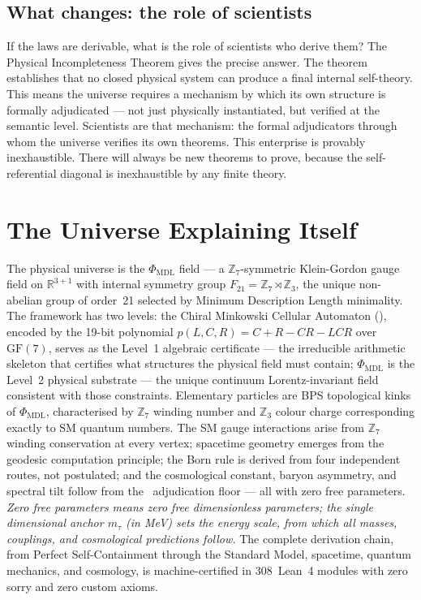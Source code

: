 \documentclass[11pt,openany]{book}
\theoremstyle{remark}
\newcommand{\PSC}{\text{PSC}}
\newcommand{\PHIMDL}{\Phi_{\mathrm{MDL}}}
\newcommand{\CMCA}{\text{CMCA}}
\newcommand{\poly}{p(L,C,R)}
\begin{document}
\subsection*{What changes: the role of scientists}

If the laws are derivable, what is the role of scientists who derive them? The
Physical Incompleteness Theorem gives the precise answer. The theorem establishes
that no closed physical system can produce a final internal self-theory. This means
the universe requires a mechanism by which its own structure is formally adjudicated
--- not just physically instantiated, but verified at the semantic level. Scientists
are that mechanism: the formal adjudicators through whom the universe verifies its
own theorems. This enterprise is provably inexhaustible. There will always be new
theorems to prove, because the self-referential diagonal is inexhaustible by
any finite theory.

\section{The Universe Explaining Itself}
\label{sec:universe_theorem}

\begin{tcolorbox}[colback=green!5,colframe=green!50!black,
  title={The Central Claim of This Monograph}]
The physical universe is the $\PHIMDL$ field --- a $\mathbb{Z}_7$-symmetric
Klein-Gordon gauge field on $\mathbb{R}^{3+1}$ with internal symmetry group
$F_{21} = \mathbb{Z}_7 \rtimes \mathbb{Z}_3$, the unique non-abelian group of
order~21 selected by Minimum Description Length minimality.
The framework has two levels: the Chiral Minkowski Cellular Automaton (\CMCA),
encoded by the 19-bit polynomial $\poly = C{+}R{-}CR{-}LCR$ over $\mathrm{GF}(7)$,
serves as the Level~1 algebraic certificate --- the irreducible arithmetic
skeleton that certifies what structures the physical field must contain;
$\PHIMDL$ is the Level~2 physical substrate --- the unique continuum
Lorentz-invariant field consistent with those constraints.
Elementary particles are BPS topological kinks of $\PHIMDL$, characterised
by $\mathbb{Z}_7$ winding number and $\mathbb{Z}_3$ colour charge
corresponding exactly to SM quantum numbers.
The SM gauge interactions arise from $\mathbb{Z}_7$ winding conservation at
every vertex; spacetime geometry emerges from the geodesic computation
principle; the Born rule is derived from four independent routes, not
postulated; and the cosmological constant, baryon asymmetry, and spectral
tilt follow from the \PSC\ adjudication floor --- all with zero free
parameters.
\emph{Zero free parameters means zero free dimensionless parameters; the single
dimensional anchor $m_\tau$ (in MeV) sets the energy scale, from which all masses,
couplings, and cosmological predictions follow.}
The complete derivation chain, from Perfect Self-Containment through the
Standard Model, spacetime, quantum mechanics, and cosmology, is
machine-certified in 308~Lean~4 modules with zero sorry and zero custom axioms.
\end{tcolorbox}
\end{document}
